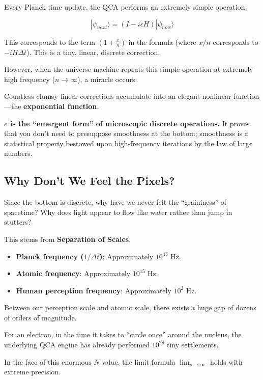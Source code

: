 \documentclass[11pt,a4paper,twoside]{book}
\begin{document}
Every Planck time update, the QCA performs an extremely simple operation:

$$|\psi_{next}\rangle = (I - i \epsilon H) |\psi_{now}\rangle$$

This corresponds to the term $(1 + \frac{x}{n})$ in the formula (where $x/n$ corresponds to $-iH\Delta t$). This is a tiny, linear, discrete correction.

However, when the universe machine repeats this simple operation at extremely high frequency ($n \to \infty$), a miracle occurs:

Countless clumsy linear corrections accumulate into an elegant nonlinear function---the \textbf{exponential function}.

\textbf{$e$ is the ``emergent form'' of microscopic discrete operations.} It proves that you don't need to presuppose smoothness at the bottom; smoothness is a statistical property bestowed upon high-frequency iterations by the law of large numbers.

\subsection{Why Don't We Feel the Pixels?}

Since the bottom is discrete, why have we never felt the ``graininess'' of spacetime? Why does light appear to flow like water rather than jump in stutters?

This stems from \textbf{Separation of Scales}.

\begin{itemize}
\item \textbf{Planck frequency ($1/\Delta t$)}: Approximately $10^{43}$ Hz.

\item \textbf{Atomic frequency}: Approximately $10^{15}$ Hz.

\item \textbf{Human perception frequency}: Approximately $10^{2}$ Hz.
\end{itemize}

Between our perception scale and atomic scale, there exists a huge gap of dozens of orders of magnitude.

For an electron, in the time it takes to ``circle once'' around the nucleus, the underlying QCA engine has already performed $10^{28}$ tiny settlements.

In the face of this enormous $N$ value, the limit formula $\lim_{n \to \infty}$ holds with extreme precision.
\end{document}
